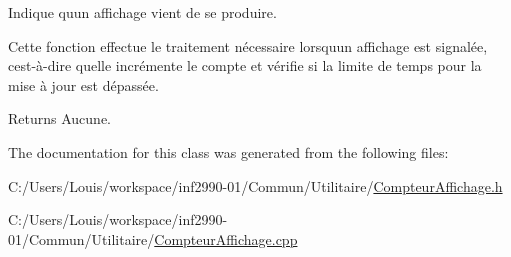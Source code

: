 Indique qu\textquotesingle{}un affichage vient de se produire. 

Cette fonction effectue le traitement nécessaire lorsqu\textquotesingle{}un affichage est signalée, c\textquotesingle{}est-\/à-\/dire qu\textquotesingle{}elle incrémente le compte et vérifie si la limite de temps pour la mise à jour est dépassée.

\begin{DoxyReturn}{Returns}
Aucune. 
\end{DoxyReturn}


The documentation for this class was generated from the following files\+:\begin{DoxyCompactItemize}
\item 
C\+:/\+Users/\+Louis/workspace/inf2990-\/01/\+Commun/\+Utilitaire/\hyperlink{_compteur_affichage_8h}{Compteur\+Affichage.\+h}\item 
C\+:/\+Users/\+Louis/workspace/inf2990-\/01/\+Commun/\+Utilitaire/\hyperlink{_compteur_affichage_8cpp}{Compteur\+Affichage.\+cpp}\end{DoxyCompactItemize}
